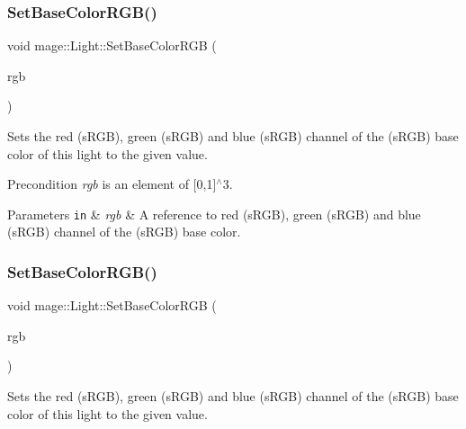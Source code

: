 \subsubsection{\texorpdfstring{Set\+Base\+Color\+R\+G\+B()}{SetBaseColorRGB()}\hspace{0.1cm}{\footnotesize\ttfamily [2/3]}}
{\footnotesize\ttfamily void mage\+::\+Light\+::\+Set\+Base\+Color\+R\+GB (\begin{DoxyParamCaption}\item[{const \hyperlink{structmage_1_1_r_g_b_spectrum}{R\+G\+B\+Spectrum} \&}]{rgb }\end{DoxyParamCaption})\hspace{0.3cm}{\ttfamily [noexcept]}}

Sets the red (s\+R\+GB), green (s\+R\+GB) and blue (s\+R\+GB) channel of the (s\+R\+GB) base color of this light to the given value.

\begin{DoxyPrecond}{Precondition}
{\itshape rgb} is an element of \mbox{[}0,1\mbox{]}$^\wedge$3. 
\end{DoxyPrecond}

\begin{DoxyParams}[1]{Parameters}
\mbox{\tt in}  & {\em rgb} & A reference to red (s\+R\+GB), green (s\+R\+GB) and blue (s\+R\+GB) channel of the (s\+R\+GB) base color. \\
\hline
\end{DoxyParams}
\hypertarget{classmage_1_1_light_afee8d91967e9c6d3df9c48ba070a8ed0}{}\label{classmage_1_1_light_afee8d91967e9c6d3df9c48ba070a8ed0} 
\subsubsection{\texorpdfstring{Set\+Base\+Color\+R\+G\+B()}{SetBaseColorRGB()}\hspace{0.1cm}{\footnotesize\ttfamily [3/3]}}
{\footnotesize\ttfamily void mage\+::\+Light\+::\+Set\+Base\+Color\+R\+GB (\begin{DoxyParamCaption}\item[{\hyperlink{structmage_1_1_r_g_b_spectrum}{R\+G\+B\+Spectrum} \&\&}]{rgb }\end{DoxyParamCaption})\hspace{0.3cm}{\ttfamily [noexcept]}}

Sets the red (s\+R\+GB), green (s\+R\+GB) and blue (s\+R\+GB) channel of the (s\+R\+GB) base color of this light to the given value.

